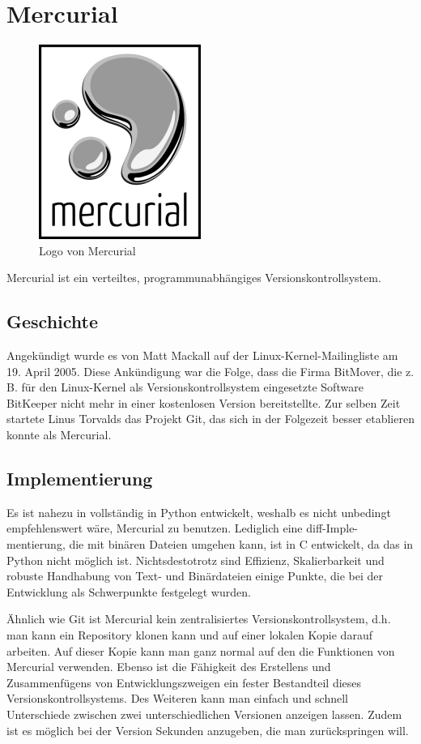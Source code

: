 \section{Mercurial}
\begin{figure}[h]
  \centering
  \includegraphics[scale=0.5]{logo-mercurial.png}
  \caption{Logo von Mercurial}
  \label{fig:mercurial}
\end{figure}
\noindent Mercurial ist ein verteiltes, programmunabhängiges Versionskontrollsystem.
\subsection{Geschichte}
Angekündigt wurde es von Matt Mackall auf der Linux-Kernel-Mailingliste am 19. April 2005. Diese Ankündigung war die Folge, dass die Firma BitMover, die z. B. für den Linux-Kernel als Versionskontrollsystem eingesetzte Software BitKeeper nicht mehr in einer kostenlosen Version bereitstellte. Zur selben Zeit startete Linus Torvalds das Projekt Git, das sich in der Folgezeit besser etablieren konnte als Mercurial.
\subsection{Implementierung}
Es ist nahezu in vollständig in Python entwickelt, weshalb es nicht unbedingt empfehlenswert wäre, Mercurial zu benutzen. Lediglich eine diff-Imple-mentierung, die mit binären Dateien umgehen kann, ist in C entwickelt, da das in Python nicht möglich ist. Nichtsdestotrotz sind Effizienz, Skalierbarkeit und robuste Handhabung von Text- und Binärdateien einige Punkte, die bei der Entwicklung als Schwerpunkte festgelegt wurden.

Ähnlich wie Git ist Mercurial kein zentralisiertes Versionskontrollsystem, d.h. man kann ein Repository klonen kann und auf einer lokalen Kopie darauf arbeiten. Auf dieser Kopie kann man ganz normal auf den die Funktionen von Mercurial verwenden. Ebenso ist die Fähigkeit des Erstellens und Zusammenfügens von Entwicklungszweigen ein fester Bestandteil dieses Versionskontrollsystems. Des Weiteren kann man einfach und schnell Unterschiede zwischen zwei unterschiedlichen Versionen anzeigen lassen. Zudem ist es möglich bei der Version Sekunden anzugeben, die man zurückspringen will.
